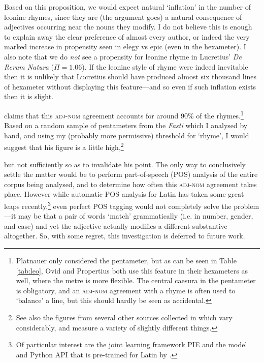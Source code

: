 \documentclass[twocolumn, switch]{article} %
\begin{document}
Based on this proposition, we would expect natural `inflation' in the number
of leonine rhymes, since they are (the argument goes) a natural consequence of
adjectives occurring near the nouns they modify. I do not believe this is
enough to explain away the clear preference of almost every author, or indeed
the very marked increase in propensity seen in elegy vs epic (even in the
hexameter). I also note that we do \emph{not} see a propensity for leonine
rhyme in Lucretius' \emph{De Rerum Natura} ($\Pi=1.06$). If the leonine style
of rhyme were indeed inevitable then it is unlikely that Lucretius should have
produced almost six thousand lines of hexameter without displaying this
feature---and so even if such inflation exists then it is slight.

 claims that this \textsc{adj}-\textsc{nom} agreement accounts
for around 90\% of the rhymes.\footnote{
  Platnauer only considered the pentameter, but as can be seen in Table
  \ref{tab:leo}, Ovid and Propertius both use this feature in their hexameters
  as well, where the metre is more flexible. The central caesura in the
  pentameter is obligatory, and an \textsc{adj}-\textsc{nom} agreement with a
  rhyme is often used to `balance' a line, but this should hardly be seen as
  accidental.
}
Based on a random sample of pentameters from the \emph{Fasti} which I analysed by
hand, and using my (probably more permissive) threshold for `rhyme', I would
suggest that his figure is a little high,\footnote{
  See also the figures from several other sources collected in  which vary considerably, and measure a variety
  of slightly different things.
}

but not sufficiently so as to invalidate his point. The only way to
conclusively settle the matter would be to perform part-of-speech (POS)
analysis of the entire corpus being analysed, and to determine how often this
\textsc{adj}-\textsc{nom} agreement takes place. However while automatic POS
analysis for Latin has taken some great leaps recently,\footnote{
  Of particular interest are the joint learning framework PIE
  \cite{manjavacas-etal-2019-improving} and the model and Python API that is
  pre-trained for Latin by .
}
even perfect POS tagging would not completely solve the problem---it may
be that a pair of words `match' grammatically (i.e. in number, gender, and
case) and yet the adjective actually modifies a different substantive
altogether. So, with some regret, this investigation is deferred to future
work.
\end{document}
